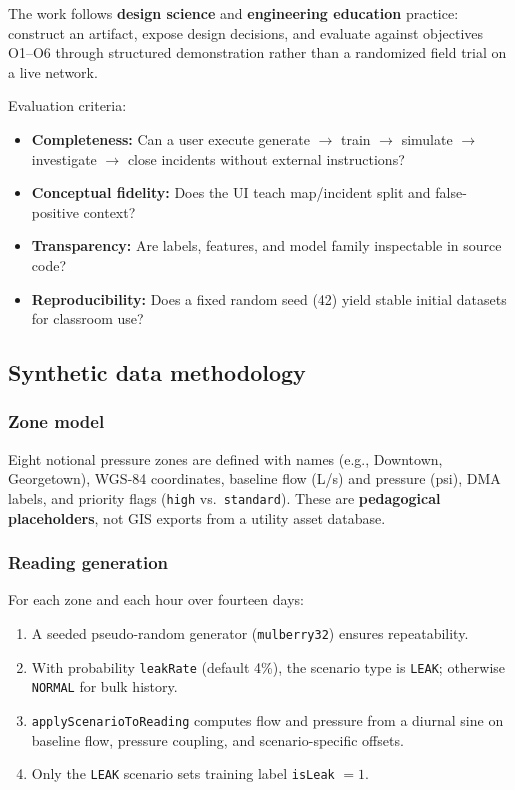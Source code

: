 \documentclass[12pt,a4paper]{article}
\begin{document}
The work follows \textbf{design science} and \textbf{engineering education} practice: construct an artifact, expose design decisions, and evaluate against objectives O1--O6 through structured demonstration rather than a randomized field trial on a live network.

Evaluation criteria:
\begin{itemize}
    \item \textbf{Completeness:} Can a user execute generate $\rightarrow$ train $\rightarrow$ simulate $\rightarrow$ investigate $\rightarrow$ close incidents without external instructions?
    \item \textbf{Conceptual fidelity:} Does the UI teach map/incident split and false-positive context?
    \item \textbf{Transparency:} Are labels, features, and model family inspectable in source code?
    \item \textbf{Reproducibility:} Does a fixed random seed (42) yield stable initial datasets for classroom use?
\end{itemize}

\subsection{Synthetic data methodology}

\subsubsection{Zone model}

Eight notional pressure zones are defined with names (e.g., Downtown, Georgetown), WGS-84 coordinates, baseline flow (L/s) and pressure (psi), DMA labels, and priority flags (\texttt{high} vs.\ \texttt{standard}). These are \textbf{pedagogical placeholders}, not GIS exports from a utility asset database.

\subsubsection{Reading generation}

For each zone and each hour over fourteen days:
\begin{enumerate}
    \item A seeded pseudo-random generator (\texttt{mulberry32}) ensures repeatability.
    \item With probability \texttt{leakRate} (default 4\%), the scenario type is \texttt{LEAK}; otherwise \texttt{NORMAL} for bulk history.
    \item \texttt{applyScenarioToReading} computes flow and pressure from a diurnal sine on baseline flow, pressure coupling, and scenario-specific offsets.
    \item Only the \texttt{LEAK} scenario sets training label \texttt{isLeak} $= 1$.
\end{enumerate}
\end{document}
